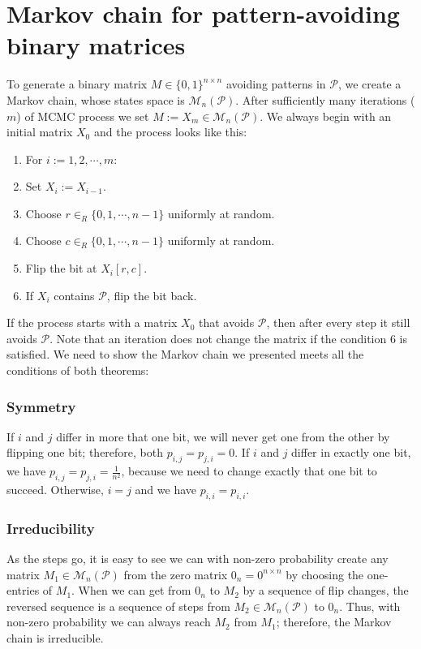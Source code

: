 \section{Markov chain for pattern-avoiding binary matrices}
\label{sect:mmcmc}
To generate a binary matrix $M\in\{0,1\}^{n\times n}$ avoiding patterns in $\mathcal{P}$, we create a Markov chain, whose states space is $\mathcal{M}_n(\mathcal{P})$. After sufficiently many iterations ($m$) of MCMC process we set $M:=X_m\in\mathcal{M}_n(\mathcal{P})$. We always begin with an initial matrix $X_0$ and the process looks like this:
\begin{enumerate}
\item For $i:=1,2,\cdots,m$:
\item \hspace{5mm} Set $X_{i}:=X_{i-1}$.
\item \hspace{5mm} Choose $r\in_R\{0,1,\cdots,n-1\}$ uniformly at random.
\item \hspace{5mm} Choose $c\in_R\{0,1,\cdots,n-1\}$ uniformly at random.
\item \hspace{5mm} Flip the bit at $X_{i}[r,c]$.
\item \hspace{5mm} If $X_{i}$ contains $\mathcal{P}$, flip the bit back.
\end{enumerate}

If the process starts with a matrix $X_0$ that avoids $\mathcal{P}$, then after every step it still avoids $\mathcal{P}$. Note that an iteration does not change the matrix if the condition 6 is satisfied. We need to show the Markov chain we presented meets all the conditions of both theorems:
\subsubsection{Symmetry}
If $i$ and $j$ differ in more that one bit, we will never get one from the other by flipping one bit; therefore, both $p_{i,j}=p_{j,i}=0$. If $i$ and $j$ differ in exactly one bit, we have $p_{i,j}=p_{j,i}=\frac{1}{n^2}$, because we need to change exactly that one bit to succeed. Otherwise, $i=j$ and we have $p_{i,i}=p_{i,i}$.
\subsubsection{Irreducibility}
As the steps go, it is easy to see we can with non-zero probability create any matrix $M_1\in\mathcal{M}_n(\mathcal{P})$ from the zero matrix $0_n=0^{n\times n}$ by choosing the one-entries of $M_1$. When we can get from $0_n$ to $M_2$ by a sequence of flip changes, the reversed sequence is a sequence of steps from $M_2\in\mathcal{M}_n(\mathcal{P})$ to $0_n$. Thus, with non-zero probability we can always reach $M_2$ from $M_1$; therefore, the Markov chain is irreducible.
